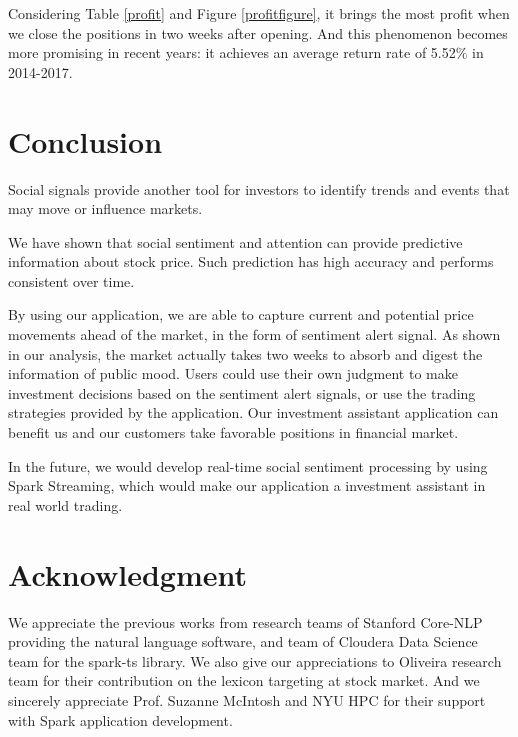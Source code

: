\documentclass[conference]{IEEEtran}
\begin{document}
Considering Table \ref{profit} and Figure \ref{profitfigure}, it brings the most profit when we close the positions in two weeks after opening. And this phenomenon becomes more promising in recent years: it achieves an average return rate of 5.52\% in 2014-2017. 
\vspace{1.0em}

\section{Conclusion}\label{Conclusion}
Social signals provide another tool for investors to identify trends and events that may move or influence markets.

We have shown that social sentiment and attention can provide predictive information about stock price. Such prediction has high accuracy and performs consistent over time. 

By using our application, we are able to capture current and potential price movements ahead of the market, in the form of sentiment alert signal. As shown in our analysis, the market actually takes two weeks to absorb and digest the information of public mood. Users could use their own judgment to make investment decisions based on the sentiment alert signals, or use the trading strategies provided by the application. Our investment assistant application can benefit us and our customers take favorable positions in financial market. 

In the future, we would develop real-time social sentiment processing by using Spark Streaming, which would make our application a investment assistant in real world trading. 
\vspace{1.0em}

\section*{Acknowledgment}

We appreciate the previous works from research teams of Stanford Core-NLP providing the natural language software, and team of Cloudera Data Science team for the spark-ts library. We also give our appreciations to Oliveira research team for their contribution on the lexicon targeting at stock market. 
And we sincerely appreciate Prof. Suzanne McIntosh and NYU HPC for their support with Spark application development. 

\end{document}
